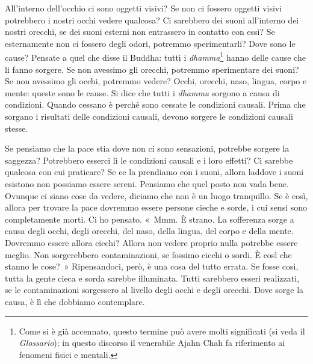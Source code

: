 All'interno dell'occhio ci sono oggetti visivi? Se non ci fossero
oggetti visivi potrebbero i nostri occhi vedere qualcosa? Ci sarebbero
dei suoni all'interno dei nostri orecchi, se dei suoni esterni non
entrassero in contatto con essi? Se esternamente non ci fossero degli
odori, potremmo sperimentarli? Dove sono le cause? Pensate a quel che
disse il Buddha: tutti i \emph{dhamma}\footnote{Come si è già accennato,
  questo termine può avere molti significati (si veda il
  \emph{Glossario}); in questo discorso il venerabile Ajahn Chah fa
  riferimento ai fenomeni fisici e mentali.} hanno delle cause che li
fanno sorgere. Se non avessimo gli orecchi, potremmo sperimentare dei
suoni? Se non avessimo gli occhi, potremmo vedere? Occhi, orecchi, naso,
lingua, corpo e mente: queste sono le cause. Si dice che tutti i
\emph{dhamma} sorgono a causa di condizioni. Quando cessano è perché
sono cessate le condizioni causali. Prima che sorgano i risultati delle
condizioni causali, devono sorgere le condizioni causali stesse.

Se pensiamo che la pace stia dove non ci sono sensazioni, potrebbe
sorgere la saggezza? Potrebbero esserci lì le condizioni causali e i
loro effetti? Ci sarebbe qualcosa con cui praticare? Se ce la prendiamo
con i suoni, allora laddove i suoni esistono non possiamo essere sereni.
Pensiamo che quel posto non vada bene. Ovunque ci siano cose da vedere,
diciamo che non è un luogo tranquillo. Se è così, allora per trovare la
pace dovremmo essere persone cieche e sorde, i cui sensi sono
completamente morti. Ci ho pensato. «~Mmm. È strano. La sofferenza sorge
a causa degli occhi, degli orecchi, del naso, della lingua, del corpo e
della mente. Dovremmo essere allora ciechi? Allora non vedere proprio
nulla potrebbe essere meglio. Non sorgerebbero contaminazioni, se
fossimo ciechi o sordi. È così che stanno le cose?~» Ripensandoci, però,
è una cosa del tutto errata. Se fosse così, tutta la gente cieca e sorda
sarebbe illuminata. Tutti sarebbero esseri realizzati, se le
contaminazioni sorgessero al livello degli occhi e degli orecchi. Dove
sorge la causa, è lì che dobbiamo contemplare.

